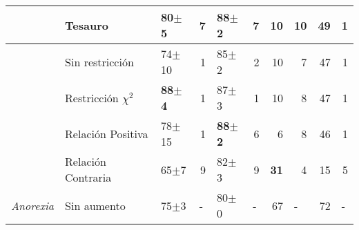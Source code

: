\begin{table}[ht]
\begin{center}
{\begin{tabular}{lllrlrrrrr}
                           & \cellcolor[HTML]{EFEFEF}Tesauro         & \cellcolor[HTML]{EFEFEF}80$\pm$5          & \cellcolor[HTML]{EFEFEF}7                     & \cellcolor[HTML]{EFEFEF}\textbf{88$\pm$2} & \cellcolor[HTML]{EFEFEF}7                     & \cellcolor[HTML]{EFEFEF}10          & \cellcolor[HTML]{EFEFEF}10                    & \cellcolor[HTML]{EFEFEF}49          & \cellcolor[HTML]{EFEFEF}1                     \\ \hline
                           & \cellcolor[HTML]{EFEFEF}Sin restricción & \cellcolor[HTML]{EFEFEF}74$\pm$10         & \cellcolor[HTML]{EFEFEF}1                     & \cellcolor[HTML]{EFEFEF}85$\pm$2          & \cellcolor[HTML]{EFEFEF}2                     & \cellcolor[HTML]{EFEFEF}10          & \cellcolor[HTML]{EFEFEF}7                     & \cellcolor[HTML]{EFEFEF}47          & \cellcolor[HTML]{EFEFEF}1                     \\ \hline
                           & Restricción $\chi^2$                         & \textbf{88$\pm$4}                         & 1                                             & 87$\pm$3                                  & 1                                             & 10                                  & 8                                             & 47                                  & 1                                             \\ \hline
                           & Relación Positiva                       & 78$\pm$15                                 & 1                                             & \textbf{88$\pm$2}                         & 6                                             & 6                                   & 8                                             & 46                                  & 1                                             \\ \hline
                           & Relación Contraria                      & 65$\pm$7                                  & 9                                             & 82$\pm$3                                  & 9                                             & \textbf{31}                         & 4                                             & 15                                  & 5                                             \\ \hline
\textit{Anorexia}          & \cellcolor[HTML]{C0C0C0}Sin aumento     & \cellcolor[HTML]{C0C0C0}75$\pm$3          & \multicolumn{1}{l}{\cellcolor[HTML]{C0C0C0}-} & \cellcolor[HTML]{C0C0C0}80$\pm$0          & \multicolumn{1}{l}{\cellcolor[HTML]{C0C0C0}-} & \cellcolor[HTML]{C0C0C0}67          & \multicolumn{1}{l}{\cellcolor[HTML]{C0C0C0}-} & \cellcolor[HTML]{C0C0C0}72          & \multicolumn{1}{l}{\cellcolor[HTML]{C0C0C0}-} \\ \hline

\end{tabular}}
\end{center}
\end{table}
